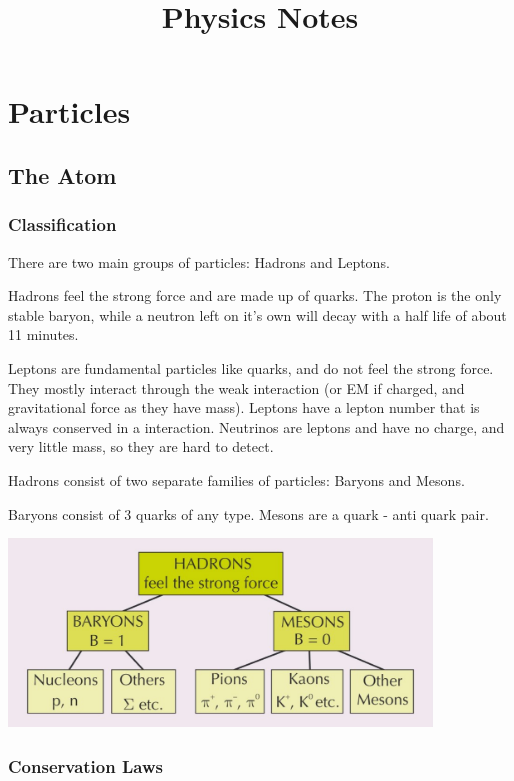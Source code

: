\documentclass[a4paper, 12pt]{article}
\title{Physics Notes}
\date{}
\begin{document}
\maketitle

\section{Particles}

\subsection{The Atom}

\subsubsection{Classification}

There are two main groups of particles: Hadrons and Leptons.

Hadrons feel the strong force and are made up of quarks. The proton is the only stable baryon, while a neutron left on it's own will decay with a half life of about 11 minutes.

Leptons are fundamental particles like quarks, and do not feel the strong force. They mostly interact through the weak interaction (or EM if charged, and gravitational force as they have mass).
Leptons have a lepton number that is always conserved in a interaction. Neutrinos are leptons and have no charge, and very little mass, so they are hard to detect.

Hadrons consist of two separate families of particles: Baryons and Mesons.

Baryons consist of 3 quarks of any type. Mesons are a quark - anti quark pair.

\begin{center}
\includegraphics[height=5cm]{hadronFamily.png}
\end{center}



\subsubsection{Conservation Laws}
\end{document}
